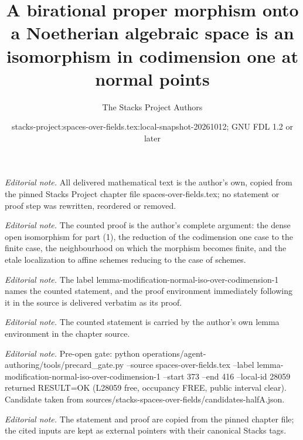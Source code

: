\documentclass[10pt,a4paper]{amsart}
\title{A birational proper morphism onto a Noetherian algebraic space is an isomorphism in codimension one at normal points}
\author{The Stacks Project Authors}
\date{stacks-project:spaces-over-fields.tex:local-snapshot-20261012; GNU FDL 1.2 or later}
\theoremstyle{plain}
\theoremstyle{definition}
\theoremstyle{remark}
\numberwithin{equation}{subsection}
\begin{document}
\maketitle
\noindent\textit{Editorial note.} All delivered mathematical text is the author's own, copied from the pinned Stacks Project chapter file spaces-over-fields.tex; no statement or proof step was rewritten, reordered or removed.\par\medskip
\noindent\textit{Editorial note.} The counted proof is the author's complete argument: the dense open isomorphism for part (1), the reduction of the codimension one case to the finite case, the neighbourhood on which the morphism becomes finite, and the etale localization to affine schemes reducing to the case of schemes.\par\medskip
\noindent\textit{Editorial note.} The label lemma-modification-normal-iso-over-codimension-1 names the counted statement, and the proof environment immediately following it in the source is delivered verbatim as its proof.\par\medskip
\noindent\textit{Editorial note.} The counted statement is carried by the author's own lemma environment in the chapter source.\par\medskip
\noindent\textit{Editorial note.} Pre-open gate: python operations/agent-authoring/tools/precard\_gate.py --source spaces-over-fields.tex --label lemma-modification-normal-iso-over-codimension-1 --start 373 --end 416 --local-id 28059 returned RESULT=OK (L28059 free, occupancy FREE, public interval clear). Candidate taken from sources/stacks-spaces-over-fields/candidates-halfA.json.\par\medskip
\noindent\textit{Editorial note.} The statement and proof are copied from the pinned chapter file; the cited inputs are kept as external pointers with their canonical Stacks tags.\par\medskip
\end{document}
